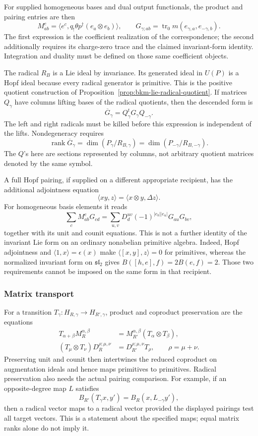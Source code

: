 For supplied homogeneous bases and dual output functionals, the
product and pairing entries are then
\[
 M_{ab}^{c}=\langle e^c,q_!\theta p^\dagger(e_a\otimes e_b)\rangle,
 \qquad
 G_{\gamma;ab}=\operatorname{tr}_0
       m(e_{\gamma,a},e_{-\gamma,b}).
\]
The first expression is the coefficient realization of the
correspondence; the second additionally requires its charge-zero
trace and the claimed invariant-form identity. Integration and
duality must be defined on those same coefficient objects.

The radical \(R_B\) is a Lie ideal by invariance. Its generated
ideal in \(U(P)\) is a Hopf ideal because every radical generator
is primitive. This is the positive quotient construction of
Proposition~\ref{prop:bkm-lie-radical-quotient}.
If matrices \(Q_\gamma\) have columns lifting bases of the
radical quotients, then the descended form is
\[
 \overline G_\gamma=Q_\gamma^tG_\gamma Q_{-\gamma}.
\]
The left and right radicals must be killed before this expression
is independent of the lifts. Nondegeneracy requires
\[
 \operatorname{rank}\overline G_\gamma
       =\dim(P_\gamma/R_{B,\gamma})
       =\dim(P_{-\gamma}/R_{B,-\gamma}).
\]
The \(Q\)'s here are sections represented by columns, not arbitrary
quotient matrices denoted by the same symbol.

A full Hopf pairing, if supplied on a different appropriate
recipient, has the additional adjointness equation
\[
 \langle xy,z\rangle
       =\langle x\otimes y,\Delta z\rangle.
\]
For homogeneous basis elements it reads
\[
 \sum_c M_{ab}^{c}G_{cd}
 =\sum_{u,v}D_d^{uv}(-1)^{|e_b||e_u|}G_{au}G_{bv},
\]
together with its unit and counit equations. This is not a further
identity of the invariant Lie form on an ordinary nonabelian
primitive algebra. Indeed, Hopf adjointness and
\(\langle1,x\rangle=\epsilon(x)\) make
\(\langle[x,y],z\rangle=0\) for primitives, whereas the
normalized invariant form on \(\mathfrak{sl}_2\) gives
\(B([h,e],f)=2B(e,f)=2\). Those two requirements cannot be
imposed on the same form in that recipient.

\subsubsection*{Matrix transport}

For a transition \(T_\gamma:H_{R,\gamma}\to H_{R',\gamma}\),
product and coproduct preservation are the equations
\[
 \begin{split}
 T_{\alpha+\beta}M_R^{\alpha,\beta}
   &=M_{R'}^{\alpha,\beta}(T_\alpha\otimes T_\beta),\\
 (T_\mu\otimes T_\nu)D_R^{\rho;\mu,\nu}
   &=D_{R'}^{\rho;\mu,\nu}T_\rho,
 \qquad \rho=\mu+\nu.
 \end{split}
\]
Preserving unit and counit then intertwines the reduced coproduct
on augmentation ideals and hence maps primitives to primitives.
Radical preservation also needs the actual pairing comparison.
For example, if an opposite-degree map \(L\) satisfies
\[
 B_{R'}(T_\gamma x,y')=B_R(x,L_{-\gamma}y'),
\]
then a radical vector maps to a radical vector provided the displayed
pairings test all target vectors. This is a statement about the
specified maps; equal matrix ranks alone do not imply it.

